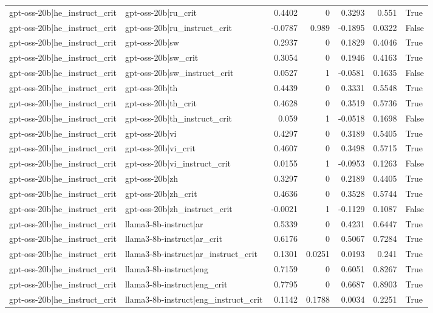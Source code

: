 \begin{table}
\begin{tabular}{l l r r r r l}
gpt-oss-20b|he_instruct_crit & gpt-oss-20b|ru_crit & 0.4402 & 0 & 0.3293 & 0.551 & True \\
gpt-oss-20b|he_instruct_crit & gpt-oss-20b|ru_instruct_crit & -0.0787 & 0.989 & -0.1895 & 0.0322 & False \\
gpt-oss-20b|he_instruct_crit & gpt-oss-20b|sw & 0.2937 & 0 & 0.1829 & 0.4046 & True \\
gpt-oss-20b|he_instruct_crit & gpt-oss-20b|sw_crit & 0.3054 & 0 & 0.1946 & 0.4163 & True \\
gpt-oss-20b|he_instruct_crit & gpt-oss-20b|sw_instruct_crit & 0.0527 & 1 & -0.0581 & 0.1635 & False \\
gpt-oss-20b|he_instruct_crit & gpt-oss-20b|th & 0.4439 & 0 & 0.3331 & 0.5548 & True \\
gpt-oss-20b|he_instruct_crit & gpt-oss-20b|th_crit & 0.4628 & 0 & 0.3519 & 0.5736 & True \\
gpt-oss-20b|he_instruct_crit & gpt-oss-20b|th_instruct_crit & 0.059 & 1 & -0.0518 & 0.1698 & False \\
gpt-oss-20b|he_instruct_crit & gpt-oss-20b|vi & 0.4297 & 0 & 0.3189 & 0.5405 & True \\
gpt-oss-20b|he_instruct_crit & gpt-oss-20b|vi_crit & 0.4607 & 0 & 0.3498 & 0.5715 & True \\
gpt-oss-20b|he_instruct_crit & gpt-oss-20b|vi_instruct_crit & 0.0155 & 1 & -0.0953 & 0.1263 & False \\
gpt-oss-20b|he_instruct_crit & gpt-oss-20b|zh & 0.3297 & 0 & 0.2189 & 0.4405 & True \\
gpt-oss-20b|he_instruct_crit & gpt-oss-20b|zh_crit & 0.4636 & 0 & 0.3528 & 0.5744 & True \\
gpt-oss-20b|he_instruct_crit & gpt-oss-20b|zh_instruct_crit & -0.0021 & 1 & -0.1129 & 0.1087 & False \\
gpt-oss-20b|he_instruct_crit & llama3-8b-instruct|ar & 0.5339 & 0 & 0.4231 & 0.6447 & True \\
gpt-oss-20b|he_instruct_crit & llama3-8b-instruct|ar_crit & 0.6176 & 0 & 0.5067 & 0.7284 & True \\
gpt-oss-20b|he_instruct_crit & llama3-8b-instruct|ar_instruct_crit & 0.1301 & 0.0251 & 0.0193 & 0.241 & True \\
gpt-oss-20b|he_instruct_crit & llama3-8b-instruct|eng & 0.7159 & 0 & 0.6051 & 0.8267 & True \\
gpt-oss-20b|he_instruct_crit & llama3-8b-instruct|eng_crit & 0.7795 & 0 & 0.6687 & 0.8903 & True \\
gpt-oss-20b|he_instruct_crit & llama3-8b-instruct|eng_instruct_crit & 0.1142 & 0.1788 & 0.0034 & 0.2251 & True \\

\end{tabular}
\end{table}
